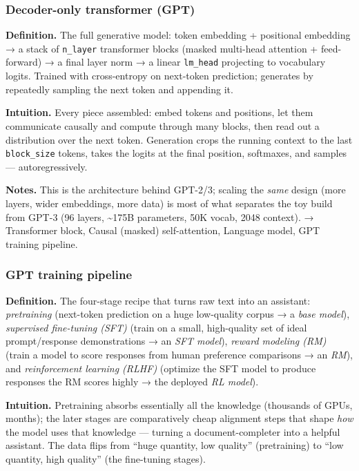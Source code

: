 \documentclass[
  10pt,
  letterpaper,
  onecolumn]{article}
\begin{document}
\hypertarget{decoder-only-transformer-gpt}{%
\subsubsection{Decoder-only transformer
(GPT)}\label{decoder-only-transformer-gpt}}

\textbf{Definition.} The full generative model: token embedding +
positional embedding → a stack of \texttt{n\_layer} transformer blocks
(masked multi-head attention + feed-forward) → a final layer norm → a
linear \texttt{lm\_head} projecting to vocabulary logits. Trained with
cross-entropy on next-token prediction; generates by repeatedly sampling
the next token and appending it.

\textbf{Intuition.} Every piece assembled: embed tokens and positions,
let them communicate causally and compute through many blocks, then read
out a distribution over the next token. Generation crops the running
context to the last \texttt{block\_size} tokens, takes the logits at the
final position, softmaxes, and samples --- autoregressively.

\textbf{Notes.} This is the architecture behind GPT-2/3; scaling the
\emph{same} design (more layers, wider embeddings, more data) is most of
what separates the toy build from GPT-3 (96 layers, \textasciitilde175B
parameters, 50K vocab, 2048 context). → Transformer block, Causal
(masked) self-attention, Language model, GPT training pipeline.

\hypertarget{gpt-training-pipeline}{%
\subsubsection{GPT training pipeline}\label{gpt-training-pipeline}}

\textbf{Definition.} The four-stage recipe that turns raw text into an
assistant: \emph{pretraining} (next-token prediction on a huge
low-quality corpus → a \emph{base model}), \emph{supervised fine-tuning
(SFT)} (train on a small, high-quality set of ideal prompt/response
demonstrations → an \emph{SFT model}), \emph{reward modeling (RM)}
(train a model to score responses from human preference comparisons → an
\emph{RM}), and \emph{reinforcement learning (RLHF)} (optimize the SFT
model to produce responses the RM scores highly → the deployed \emph{RL
model}).

\textbf{Intuition.} Pretraining absorbs essentially all the knowledge
(thousands of GPUs, months); the later stages are comparatively cheap
alignment steps that shape \emph{how} the model uses that knowledge ---
turning a document-completer into a helpful assistant. The data flips
from ``huge quantity, low quality'' (pretraining) to ``low quantity,
high quality'' (the fine-tuning stages).
\end{document}
